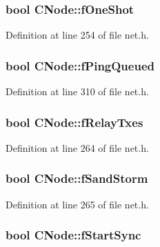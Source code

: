 \subsubsection[{f\+One\+Shot}]{\setlength{\rightskip}{0pt plus 5cm}bool C\+Node\+::f\+One\+Shot}\label{class_c_node_a2bb91c9968a9f855c05b1121100a8797}


Definition at line 254 of file net.\+h.

\hypertarget{class_c_node_aa1e9c1dc1d5cf806b9be0af155c0bf90}{}
\subsubsection[{f\+Ping\+Queued}]{\setlength{\rightskip}{0pt plus 5cm}bool C\+Node\+::f\+Ping\+Queued}\label{class_c_node_aa1e9c1dc1d5cf806b9be0af155c0bf90}


Definition at line 310 of file net.\+h.

\hypertarget{class_c_node_ab387bb0c4ffd42e3f0aea233dca0e301}{}
\subsubsection[{f\+Relay\+Txes}]{\setlength{\rightskip}{0pt plus 5cm}bool C\+Node\+::f\+Relay\+Txes}\label{class_c_node_ab387bb0c4ffd42e3f0aea233dca0e301}


Definition at line 264 of file net.\+h.

\hypertarget{class_c_node_aab66b45769e6c8009d224c63704a1859}{}
\subsubsection[{f\+Sand\+Storm}]{\setlength{\rightskip}{0pt plus 5cm}bool C\+Node\+::f\+Sand\+Storm}\label{class_c_node_aab66b45769e6c8009d224c63704a1859}


Definition at line 265 of file net.\+h.

\hypertarget{class_c_node_a4009c240ccb6d085ae57e8cf4d4c2cb6}{}
\subsubsection[{f\+Start\+Sync}]{\setlength{\rightskip}{0pt plus 5cm}bool C\+Node\+::f\+Start\+Sync}\label{class_c_node_a4009c240ccb6d085ae57e8cf4d4c2cb6}


